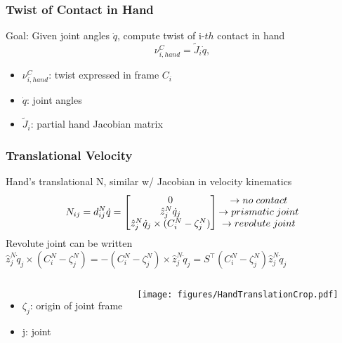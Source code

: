 \documentclass{beamer}
\begin{document}
\begin{frame}
\frametitle{Twist of Contact in Hand}
Goal: Given joint angles $\dot{q}$, compute twist of i-$th$ contact in hand 
\begin{equation*}
\nu_{i,hand}^C=\tilde{J}_i \dot{q},
\end{equation*}
\begin{itemize}
\item $\nu_{i,hand}^C$: twist expressed in frame {$C_i$} \vspace{.2cm}
\item $\dot{q}$: joint angles \vspace{.2cm}
\item $\tilde{J}_i$: partial hand Jacobian matrix \vspace{.2cm}
\end{itemize}
\end{frame}


\begin{frame}
\frametitle{Translational Velocity }
Hand's translational N, similar w/ Jacobian in velocity kinematics 
\begin{equation*}
N_{ij}=d_{ij}^N\dot{q}=\begin{bmatrix}
0\\
\hat{z}_{j}^{N}\dot{q}_j\\
\hat{z}_{j}^{N}\dot{q}_j\times (C_{i}^{N}-\zeta_{j}^{N})
\end{bmatrix}
\begin{matrix}
\rightarrow no \hspace{.1cm} contact\\
\rightarrow prismatic \hspace{.1cm} joint\\
\rightarrow revolute \hspace{.1cm} joint
\end{matrix}
\end{equation*}
Revolute joint can be written 
$\hat{z}_{j}^{N}\dot{q}_j\times (C_{i}^{N}-\zeta_{j}^{N})=-(C_{i}^{N}-\zeta_{j}^{N})\times \hat{z}_{j}^{N}\dot{q}_j=S^{\intercal}(C_{i}^{N}-\zeta_{j}^{N})\hat{z}_{j}^{N}\dot{q}_j$

\begin{columns}[c] 
\begin{itemize}
\item $\zeta_j$: origin of joint frame
\item j: joint 
\end{itemize}

\centering
 \texttt{[image: figures/HandTranslationCrop.pdf]}
\end{columns}

\end{frame}
\end{document}
